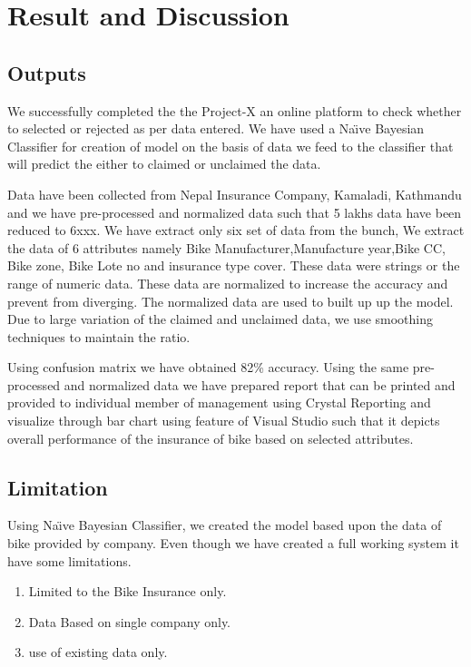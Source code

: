 \chapter{Result and Discussion}
\section{Outputs}
We successfully completed the the Project-X an online platform to check whether to selected or rejected as per data entered. We have used a Na\"{\i}ve Bayesian Classifier for creation of model on the basis  of data we feed to the classifier that will predict the either to claimed or unclaimed the data.
\par
Data have been collected from Nepal Insurance Company, Kamaladi, Kathmandu and we have pre-processed and normalized data such that 5 lakhs data have been reduced to 6xxx. We have extract only six set of data from the bunch, We extract the data of 6 attributes namely Bike Manufacturer,Manufacture year,Bike CC, Bike zone, Bike Lote no and insurance type cover. These data were strings or the range of numeric data. These data are normalized to increase the accuracy and prevent from diverging.
The normalized data are used to built up up the  model. Due to large variation of the claimed and unclaimed data, we use smoothing techniques to maintain the ratio.

\par
Using confusion matrix we have obtained 82\% accuracy. Using the same pre-processed and normalized data we have prepared report that can be printed and provided to individual member of management using Crystal Reporting and visualize through bar chart using feature of Visual Studio such that it depicts overall performance of the insurance of bike based on selected attributes.



\section{Limitation}
Using Na\"{\i}ve Bayesian Classifier, we created the model based upon the data of bike provided by company. Even though we have created a full working system it have some limitations.
\begin{enumerate}
\item Limited to the Bike Insurance only.
\item Data Based on single company only.
\item use of existing data only.
\end{enumerate}


